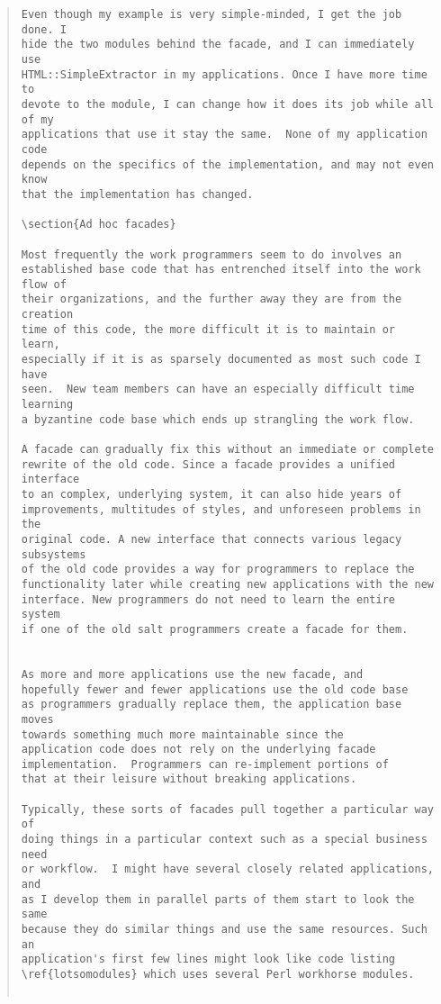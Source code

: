 \begin{quote}
\begin{verbatim}
Even though my example is very simple-minded, I get the job done. I
hide the two modules behind the facade, and I can immediately use
HTML::SimpleExtractor in my applications. Once I have more time to
devote to the module, I can change how it does its job while all of my
applications that use it stay the same.  None of my application code
depends on the specifics of the implementation, and may not even know
that the implementation has changed.

\section{Ad hoc facades}

Most frequently the work programmers seem to do involves an
established base code that has entrenched itself into the work flow of
their organizations, and the further away they are from the creation
time of this code, the more difficult it is to maintain or learn,
especially if it is as sparsely documented as most such code I have
seen.  New team members can have an especially difficult time learning
a byzantine code base which ends up strangling the work flow.

A facade can gradually fix this without an immediate or complete
rewrite of the old code. Since a facade provides a unified interface
to an complex, underlying system, it can also hide years of
improvements, multitudes of styles, and unforeseen problems in the
original code. A new interface that connects various legacy subsystems
of the old code provides a way for programmers to replace the
functionality later while creating new applications with the new
interface. New programmers do not need to learn the entire system
if one of the old salt programmers create a facade for them.


As more and more applications use the new facade, and
hopefully fewer and fewer applications use the old code base
as programmers gradually replace them, the application base moves
towards something much more maintainable since the
application code does not rely on the underlying facade
implementation.  Programmers can re-implement portions of
that at their leisure without breaking applications.

Typically, these sorts of facades pull together a particular way of
doing things in a particular context such as a special business need
or workflow.  I might have several closely related applications, and
as I develop them in parallel parts of them start to look the same
because they do similar things and use the same resources. Such an
application's first few lines might look like code listing
\ref{lotsomodules} which uses several Perl workhorse modules.


\end{verbatim}
\end{quote}
